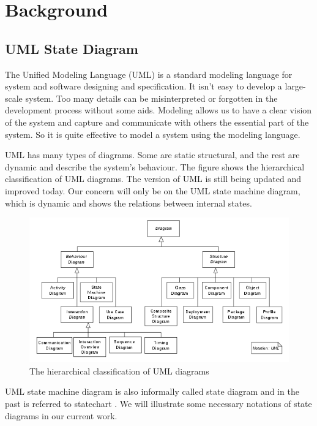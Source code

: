\chapter{Background}
\label{chap:background}

\section{ UML State Diagram}
The Unified Modeling Language\cite{miles_hamilton_2008} (UML) is a standard modeling language for system and software designing and specification. 
It isn't easy to develop a large-scale system.
Too many details can be misinterpreted or forgotten in the development process without some aids. 
Modeling allows us to have a clear vision of the system and capture and communicate with others the essential part of the system. 
So it is quite effective to model a system using the modeling language. 

UML has many types of diagrams. 
Some are static structural, and the rest are dynamic and describe the system's behaviour\cite{UML}. 
The figure shows the hierarchical classification of UML diagrams. 
The version of UML is still being updated and improved today. 
Our concern will only be on the UML state machine diagram, which is dynamic and shows the relations between internal states.
\begin{figure}[ht]
    \centering
    \includegraphics[scale=0.6]{Bilder/UMLOverview.png}
    \caption{The hierarchical classification of UML diagrams\cite{UML}}
    \label{fig:classification}
\end{figure}

UML state machine diagram is also informally called state diagram and in the past is referred to statechart \cite{harel_1987}.
We will illustrate some necessary notations of state diagrams in our current work.

